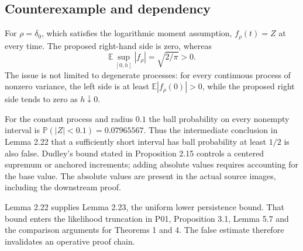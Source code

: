 \documentclass[10pt]{article}
\begin{document}
\subsection*{Counterexample and dependency}
For \(\rho=\delta_0\), which satisfies the logarithmic moment assumption, \(f_\rho(t)=Z\) at every time. The proposed right-hand side is zero, whereas \[\mathbb E\sup_{[0,h]}|f_\rho|=\sqrt{2/\pi}>0.\] The issue is not limited to degenerate processes: for every continuous process of nonzero variance, the left side is at least \(\mathbb E|f_\rho(0)|>0\), while the proposed right side tends to zero as \(h\downarrow0\).\par
For the constant process and radius \(0.1\) the ball probability on every nonempty interval is \(\mathbb P(|Z|<0.1)=0.07965567\). Thus the intermediate conclusion in Lemma 2.22 that a sufficiently short interval has ball probability at least \(1/2\) is also false. Dudley’s bound stated in Proposition 2.15 controls a centered supremum or anchored increments; adding absolute values requires accounting for the base value. The absolute values are present in the actual source images, including the downstream proof.\par
Lemma 2.22 supplies Lemma 2.23, the uniform lower persistence bound. That bound enters the likelihood truncation in P01, Proposition 3.1, Lemma 5.7 and the comparison arguments for Theorems 1 and 4. The false estimate therefore invalidates an operative proof chain.\par
\end{document}
